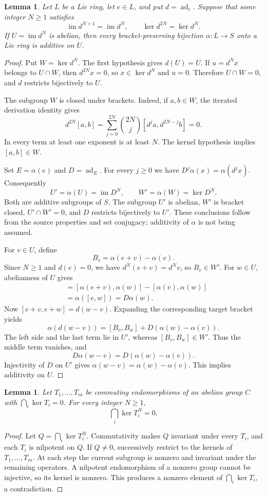 \documentclass[11pt]{article}
\newtheorem{lemma}[theorem]{Lemma}
\theoremstyle{definition}
\DeclareMathOperator{\ad}{ad}
\DeclareMathOperator{\im}{im}
\begin{document}
\begin{lemma}\label{lem:fitting}
Let $L$ be a Lie ring, let $e\in L$, and put $d=\ad_e$. Suppose that some integer $N\ge1$ satisfies
\[
 \im d^{N+1}=\im d^N,\qquad \ker d^{2N}=\ker d^N.
\]
If $U=\im d^N$ is abelian, then every bracket-preserving bijection $\alpha:L\to S$ onto a Lie ring is additive on $U$.
\end{lemma}
\begin{proof}
Put $W=\ker d^N$. The first hypothesis gives $d(U)=U$. If $u=d^Nx$ belongs to $U\cap W$, then $d^{2N}x=0$, so $x\in\ker d^N$ and $u=0$. Therefore $U\cap W=0$, and $d$ restricts bijectively to $U$.

The subgroup $W$ is closed under brackets. Indeed, if $a,b\in W$, the iterated derivation identity gives
\[
 d^{2N}[a,b]=\sum_{j=0}^{2N}\binom{2N}{j}[d^ja,d^{2N-j}b]=0.
\]
In every term at least one exponent is at least $N$. The kernel hypothesis implies $[a,b]\in W$.

Set $E=\alpha(e)$ and $D=\ad_E$. For every $j\ge0$ we have $D^j\alpha(x)=\alpha(d^jx)$. Consequently
\[
 U'=\alpha(U)=\im D^N,\qquad W'=\alpha(W)=\ker D^N.
\]
Both are additive subgroups of $S$. The subgroup $U'$ is abelian, $W'$ is bracket closed, $U'\cap W'=0$, and $D$ restricts bijectively to $U'$. These conclusions follow from the source properties and set conjugacy; additivity of $\alpha$ is not being assumed.

For $v\in U$, define
\[
 B_v=\alpha(e+v)-\alpha(v).
\]
Since $N\ge1$ and $d(e)=0$, we have $d^N(e+v)=d^Nv$, so $B_v\in W'$. For $w\in U$, abelianness of $U$ gives
\begin{align*}
 [B_v,\alpha(w)]
 &=[\alpha(e+v),\alpha(w)]-[\alpha(v),\alpha(w)]\\
 &=\alpha([e,w])=D\alpha(w).
\end{align*}
Now $[e+v,e+w]=d(w-v)$. Expanding the corresponding target bracket yields
\[
 \alpha(d(w-v))=[B_v,B_w]+D(\alpha(w)-\alpha(v)).
\]
The left side and the last term lie in $U'$, whereas $[B_v,B_w]\in W'$. Thus the middle term vanishes, and
\[
 D\alpha(w-v)=D(\alpha(w)-\alpha(v)).
\]
Injectivity of $D$ on $U'$ gives $\alpha(w-v)=\alpha(w)-\alpha(v)$. This implies additivity on $U$.
\end{proof}

\begin{lemma}\label{lem:nilpotents}
Let $T_1,\ldots,T_m$ be commuting endomorphisms of an abelian group $C$ with $\bigcap_i\ker T_i=0$. For every integer $N\ge1$,
\[
 \bigcap_i\ker T_i^N=0.
\]
\end{lemma}
\begin{proof}
Let $Q=\bigcap_i\ker T_i^N$. Commutativity makes $Q$ invariant under every $T_i$, and each $T_i$ is nilpotent on $Q$. If $Q\ne0$, successively restrict to the kernels of $T_1,\ldots,T_m$. At each step the current subgroup is nonzero and invariant under the remaining operators. A nilpotent endomorphism of a nonzero group cannot be injective, so its kernel is nonzero. This produces a nonzero element of $\bigcap_i\ker T_i$, a contradiction.
\end{proof}
\end{document}
